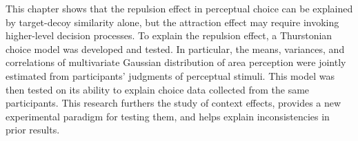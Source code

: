 This chapter shows that the repulsion effect in perceptual choice can be explained by target-decoy similarity alone, but the attraction effect may require invoking higher-level decision processes. To explain the repulsion effect, a Thurstonian choice model was developed and tested. In particular, the means, variances, and correlations of multivariate Gaussian distribution of area perception were jointly estimated from participants' judgments of perceptual stimuli. This model was then tested on its ability to explain choice data collected from the same participants. This research furthers the study of context effects, provides a new experimental paradigm for testing them, and helps explain inconsistencies in prior results.
